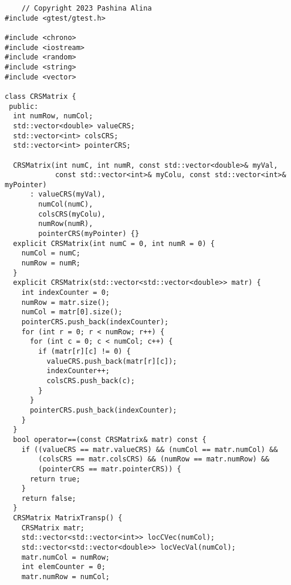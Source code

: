 \documentclass[14pt, russian]{extarticle}
\begin{document}
	\begin{lstlisting}
    // Copyright 2023 Pashina Alina
#include <gtest/gtest.h>

#include <chrono>
#include <iostream>
#include <random>
#include <string>
#include <vector>

class CRSMatrix {
 public:
  int numRow, numCol;
  std::vector<double> valueCRS;
  std::vector<int> colsCRS;
  std::vector<int> pointerCRS;

  CRSMatrix(int numC, int numR, const std::vector<double>& myVal,
            const std::vector<int>& myColu, const std::vector<int>& myPointer)
      : valueCRS(myVal),
        numCol(numC),
        colsCRS(myColu),
        numRow(numR),
        pointerCRS(myPointer) {}
  explicit CRSMatrix(int numC = 0, int numR = 0) {
    numCol = numC;
    numRow = numR;
  }
  explicit CRSMatrix(std::vector<std::vector<double>> matr) {
    int indexCounter = 0;
    numRow = matr.size();
    numCol = matr[0].size();
    pointerCRS.push_back(indexCounter);
    for (int r = 0; r < numRow; r++) {
      for (int c = 0; c < numCol; c++) {
        if (matr[r][c] != 0) {
          valueCRS.push_back(matr[r][c]);
          indexCounter++;
          colsCRS.push_back(c);
        }
      }
      pointerCRS.push_back(indexCounter);
    }
  }
  bool operator==(const CRSMatrix& matr) const {
    if ((valueCRS == matr.valueCRS) && (numCol == matr.numCol) &&
        (colsCRS == matr.colsCRS) && (numRow == matr.numRow) &&
        (pointerCRS == matr.pointerCRS)) {
      return true;
    }
    return false;
  }
  CRSMatrix MatrixTransp() {
    CRSMatrix matr;
    std::vector<std::vector<int>> locCVec(numCol);
    std::vector<std::vector<double>> locVecVal(numCol);
    matr.numCol = numRow;
    int elemCounter = 0;
    matr.numRow = numCol;


\end{lstlisting}
\end{document}

